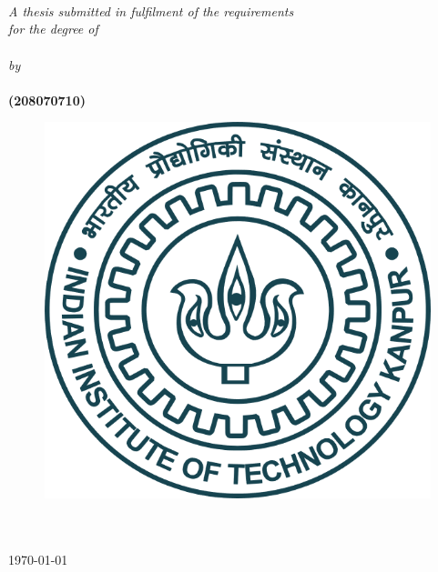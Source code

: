 \documentclass[11pt, a4paper, oneside]{Thesis} %
\begin{document}
\begin{titlepage}
\begin{center}

\HRule \\[0.4cm] %
{\huge \bfseries \ttitle}\\[0.4cm] %
\HRule \\[1.5cm] %
 
\large \textit{A thesis submitted in fulfilment of the requirements\\ for the degree of}\\[0.3cm]
\textbf{\degreename}\\[0.3cm] %
\textit{by}\\[0.3cm]
\textbf{\authornames} \\[0.3cm]
\textbf{(208070710)}

\vfill
\graphicspath{ {./Figures/} }
\begin{figure}[hb]
  \centering
  \includegraphics[width=0.35\linewidth]{images/iitk_logo.png}
\end{figure}

\DEPTNAME\\ %
\textsc{ \UNIVNAME}\\[1.5cm] %
\large \today\\[2cm] %


\end{center}

\end{titlepage}


\setcounter{page}{2}
\end{document}
